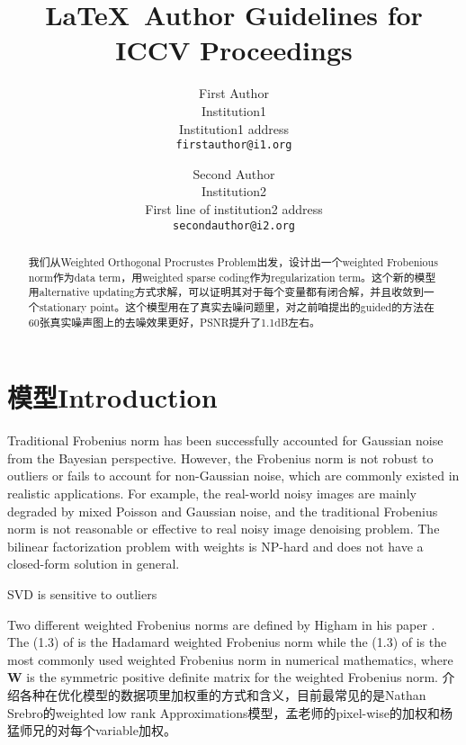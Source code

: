 \documentclass[10pt,twocolumn,letterpaper]{article}
\begin{document}
\title{\LaTeX\ Author Guidelines for ICCV Proceedings}

\author{First Author\\
Institution1\\
Institution1 address\\
{\tt\small firstauthor@i1.org}
\and
Second Author\\
Institution2\\
First line of institution2 address\\
{\tt\small secondauthor@i2.org}
}

\maketitle


\begin{abstract}
我们从Weighted Orthogonal Procrustes Problem出发，设计出一个weighted Frobenious norm作为data term，用weighted sparse coding作为regularization term。这个新的模型用alternative updating方式求解，可以证明其对于每个变量都有闭合解，并且收敛到一个stationary point。这个模型用在了真实去噪问题里，对之前咱提出的guided的方法在60张真实噪声图上的去噪效果更好，PSNR提升了1.1dB左右。
\end{abstract}

\section{模型Introduction}
Traditional Frobenius norm has been successfully accounted for Gaussian noise from the Bayesian perspective. However, the Frobenius norm is not robust to outliers or fails to account for non-Gaussian noise, which are commonly existed in realistic applications. For example, the real-world noisy images are mainly degraded by mixed Poisson and Gaussian noise, and the traditional Frobenius norm is not reasonable or effective to real noisy image denoising problem. The bilinear factorization problem with weights is NP-hard and does not have a closed-form solution in general. 

SVD is sensitive to outliers

Two different weighted Frobenius norms are defined by Higham in his paper \cite{higham2002computing}. The (1.3) of \cite{higham2002computing} is the Hadamard weighted Frobenius norm while the (1.3) of \cite{higham2002computing} is the most commonly used weighted Frobenius norm in numerical mathematics, where $\mathbf{W}$ is the symmetric positive definite matrix for the weighted Frobenius norm. 
介绍各种在优化模型的数据项里加权重的方式和含义，目前最常见的是Nathan Srebro的weighted low rank Approximations模型，孟老师的pixel-wise的加权和杨猛师兄的对每个variable加权。
\end{document}
